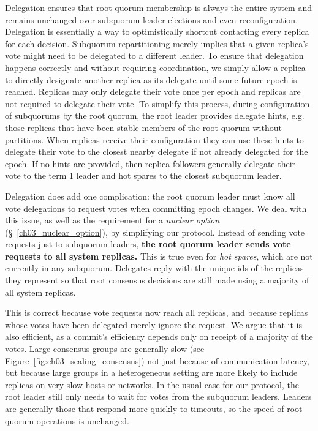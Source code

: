Delegation ensures that root quorum membership is always the entire system and remains unchanged over subquorum leader elections and even reconfiguration.
Delegation is essentially a way to optimistically shortcut contacting every replica for each decision.
Subquorum repartitioning merely implies that a given replica's vote might need to be delegated to a different leader.
To ensure that delegation happens correctly and without requiring coordination, we simply allow a replica to directly designate another replica as its delegate until some future epoch is reached.
Replicas may only delegate their vote once per epoch and replicas are not required to delegate their vote.
To simplify this process, during configuration of subquorums by the root quorum, the root leader provides delegate hints, e.g. those replicas that have been stable members of the root quorum without partitions.
When replicas receive their configuration they can use these hints to delegate their vote to the closest nearby delegate if not already delegated for the epoch.
If no hints are provided, then replica followers generally delegate their vote to the term 1 leader and hot spares to the closest subquorum leader.

Delegation does add one complication: the root quorum leader must know all vote delegations to request votes when committing epoch changes.
We deal with this issue, as well as the requirement for a \emph{nuclear option} (\S~\ref{ch03_nuclear_option}), by simplifying our protocol.
Instead of sending vote requests just to subquorum leaders, \textbf{the root quorum leader sends vote requests to all system replicas.}
This is true even for \emph{hot spares}, which are not currently in any subquorum.
Delegates reply with the unique ids of the replicas they represent so that root consensus decisions are still made using a majority of all system replicas.

This is correct because vote requests now reach all replicas, and because replicas whose votes have been delegated merely ignore the request.
We argue that it is also efficient, as a commit's efficiency depends only on receipt of a majority of the votes.
Large consensus groups are generally slow (see Figure~\ref{fig:ch03_scaling_consensus}) not just because of communication latency, but because large groups in a heterogeneous setting are more likely to include replicas on very slow hosts or networks.
In the usual case for our protocol, the root leader still only needs to wait for votes from the subquorum leaders.
Leaders are generally those that respond more quickly to timeouts, so the
speed of root quorum operations is unchanged.

